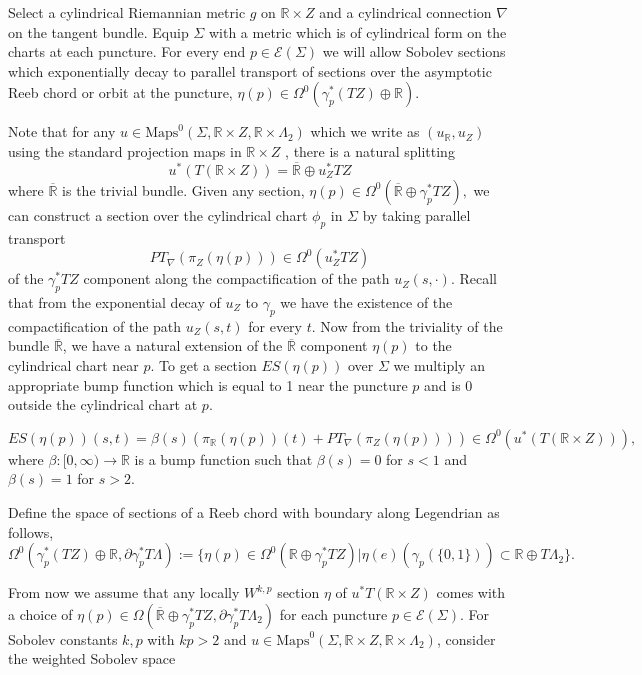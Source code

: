 \documentclass[11pt, oneside,dvipsnames]{amsart}
\renewcommand{\to}{\rightarrow}
\newcommand{\Maps}{\text{Maps}}
\renewcommand{\to}{\rightarrow}
\newcommand{\<}{\langle}
\renewcommand{\>}{\rangle}
\newcommand{\bR}{\mathbb{R}}
\newcommand{\cE}{\mathcal{E}}
\renewcommand{\to}{\rightarrow}
\theoremstyle{definition}
\theoremstyle{definition}
\numberwithin{equation}{subsection}
\begin{document}
Select a cylindrical Riemannian metric $g$ on $\bR \times Z$ and a cylindrical connection $\nabla$ on the tangent bundle.  Equip $\Sigma$ with a 
metric which is of cylindrical form on the charts at each puncture. For every end $p \in \mathcal{E}(\Sigma)$ we will allow Sobolev sections which exponentially decay to parallel transport of sections over the asymptotic Reeb chord or orbit at the puncture, $\eta(p) \in \Omega^0(\gamma_p^*(TZ) \oplus \mathbb{R})$.

\noindent Note that for any $u\in \Maps^0(\Sigma,\bR \times Z , \bR \times \Lambda_2)$ which we write as $(u_\bR, u_Z)$ using the standard projection maps in $\bR\times Z$ , there is a natural splitting $$u^*(T (\bR \times Z)) = \overline{\bR} \oplus u_Z^* TZ $$
where $\overline{\bR}$ is the trivial bundle. Given any section, $\eta(p) \in \Omega^0(\overline{\bR} \oplus \gamma_p^* TZ),$ we can construct a section over the cylindrical chart $\phi_p$ in $\Sigma$ by taking parallel transport $$PT_\nabla(\pi_Z (\eta(p)))\in \Omega^0(u_Z^* TZ)$$ of the $\gamma_p^* TZ$ component along the compactification of the path $u_Z(s,\cdot)$. Recall that from the exponential decay of $u_Z$ to $\gamma_p$ we have the existence of the compactification of the path $u_Z(s,t)$ for every $t.$ Now from the triviality of the bundle $\overline{\bR}$, we have a natural extension of the $\overline{\bR}$ component $\eta(p)$ to the cylindrical chart near $p$. To get a section $ES(\eta(p))$ over $\Sigma$ we multiply an appropriate bump function which is equal to 1 near the puncture $p$ and is 0 outside the cylindrical chart at $p$. 

$$ES(\eta(p))(s,t) = \beta(s)(\pi_\bR (\eta(p)) (t) + PT_\nabla(\pi_Z(\eta(p))) ) \in \Omega^0(u^*(T(\bR \times Z))),$$
where $\beta : [0,\infty) \to \bR$ is a bump function such that $\beta(s)=0 $ for $s<1$ and $\beta(s) =1 $ for $s>2.$

Define the space of sections of a Reeb chord with boundary along Legendrian as follows,
$$
  \Omega^0(\gamma_p^*(TZ) \oplus \mathbb{R}, \partial \gamma_p ^* T\Lambda)  := \{ \eta(p) \in \Omega^0(\mathbb{R} \oplus \gamma_p^* TZ  ) |   \eta(e)(\gamma_p(\{0,1 \})) \subset  \mathbb{R} \oplus T\Lambda_2 \} . 
$$

\noindent From now we assume that any locally $W^{k,p}$ section $\eta$ of $u^*T(\bR \times Z)$ comes with a choice of $\eta(p) \in \Omega(\overline{\bR} \oplus \gamma_p^*{TZ},\partial \gamma_p^* T\Lambda_2) $ for each puncture $p\in \cE(\Sigma).$  For Sobolev constants $k, p$ with $kp>2$ and $u\in \Maps^0(\Sigma, \bR\times Z, \bR \times \Lambda_2)$, consider the weighted Sobolev space
\end{document}
